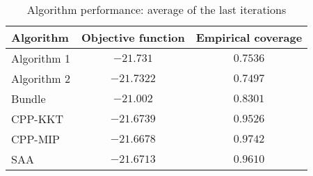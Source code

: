\begin{table}[ht]
    \centering
    \begin{tabular}{lcc}
    \toprule
    \textbf{Algorithm} & \textbf{Objective function} & \textbf{Empirical coverage} \\
    \midrule
    Algorithm 1 & $-21.731$ & $0.7536$ \\
Algorithm 2 & $-21.7322$ & $0.7497$ \\
Bundle & $-21.002$ & $0.8301$ \\
CPP-KKT & $-21.6739$ & $0.9526$ \\
CPP-MIP & $-21.6678$ & $0.9742$ \\
SAA & $-21.6713$ & $0.9610$ \\
\bottomrule
    \end{tabular}
    \caption{Algorithm performance: average of the last iterations}
    \end{table}
